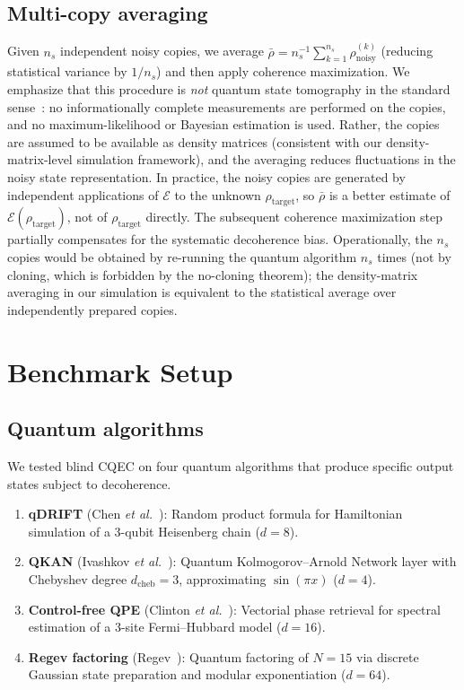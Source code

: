\documentclass[prx,twocolumn,superscriptaddress,longbibliography,floatfix]{revtex4-2}
\newcommand{\EE}{\mathcal{E}}
\newcommand{\rhot}{\rho_\mathrm{target}}
\newcommand{\rhon}{\rho_\mathrm{noisy}}
\begin{document}
\subsection{Multi-copy averaging}
\label{sec:multicopy}

Given $n_s$ independent noisy copies, we average $\bar\rho = n_s^{-1}\sum_{k=1}^{n_s} \rhon^{(k)}$ (reducing statistical variance by $1/n_s$) and then apply coherence maximization.
We emphasize that this procedure is \emph{not} quantum state tomography in the standard sense~\cite{Hradil1997,Haah2017}: no informationally complete measurements are performed on the copies, and no maximum-likelihood or Bayesian estimation is used.
Rather, the copies are assumed to be available as density matrices (consistent with our density-matrix-level simulation framework), and the averaging reduces fluctuations in the noisy state representation.
In practice, the noisy copies are generated by independent applications of $\EE$ to the unknown $\rhot$, so $\bar\rho$ is a better estimate of $\EE(\rhot)$, not of $\rhot$ directly.
The subsequent coherence maximization step partially compensates for the systematic decoherence bias.
Operationally, the $n_s$ copies would be obtained by re-running the quantum algorithm $n_s$ times (not by cloning, which is forbidden by the no-cloning theorem); the density-matrix averaging in our simulation is equivalent to the statistical average over independently prepared copies.


\section{Benchmark Setup}
\label{sec:setup}

\subsection{Quantum algorithms}
\label{sec:algorithms}

We tested blind CQEC on four quantum algorithms that produce specific output states subject to decoherence.

\begin{enumerate}
\item \textbf{qDRIFT} (Chen \emph{et al.}~\cite{Chen2021}): Random product formula for Hamiltonian simulation of a 3-qubit Heisenberg chain ($d = 8$).
\item \textbf{QKAN} (Ivashkov \emph{et al.}~\cite{Ivashkov2024}): Quantum Kolmogorov--Arnold Network layer with Chebyshev degree $d_\mathrm{cheb} = 3$, approximating $\sin(\pi x)$ ($d = 4$).
\item \textbf{Control-free QPE} (Clinton \emph{et al.}~\cite{Clinton2026}): Vectorial phase retrieval for spectral estimation of a 3-site Fermi--Hubbard model ($d = 16$).
\item \textbf{Regev factoring} (Regev~\cite{Regev2024}): Quantum factoring of $N = 15$ via discrete Gaussian state preparation and modular exponentiation ($d = 64$).
\end{enumerate}
\end{document}
